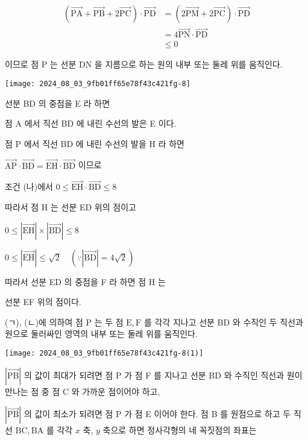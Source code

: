 \documentclass[10pt]{article}
\begin{document}
\[
\begin{aligned}
(\overrightarrow{\mathrm{PA}}+\overrightarrow{\mathrm{PB}}+2 \overrightarrow{\mathrm{PC}}) \cdot \overrightarrow{\mathrm{PD}} & =(2 \overrightarrow{\mathrm{PM}}+2 \overrightarrow{\mathrm{PC}}) \cdot \overrightarrow{\mathrm{PD}} \\
& =4 \overrightarrow{\mathrm{PN}} \cdot \overrightarrow{\mathrm{PD}} \\
& \leq 0
\end{aligned}
\]

이므로 점 P 는 선분 DN 을 지름으로 하는 원의 내부 또는 둘레 위를 움직인다.

\begin{center}
\texttt{[image: 2024\_08\_03\_9fb01ff65e78f43c421fg-8]}
\end{center}

선분 BD 의 중점을 E 라 하면

점 A 에서 직선 BD 에 내린 수선의 발은 E 이다.

점 P 에서 직선 BD 에 내린 수선의 발을 H 라 하면

\(\overrightarrow{\mathrm{AP}} \cdot \overrightarrow{\mathrm{BD}}=\overrightarrow{\mathrm{EH}} \cdot \overrightarrow{\mathrm{BD}}\) 이므로

조건 (나)에서 \(0 \leq \overrightarrow{\mathrm{EH}} \cdot \overrightarrow{\mathrm{BD}} \leq 8\)

따라서 점 H 는 선분 ED 위의 점이고

\(0 \leq|\overrightarrow{\mathrm{EH}}| \times|\overrightarrow{\mathrm{BD}}| \leq 8\)

\(0 \leq|\overrightarrow{\mathrm{EH}}| \leq \sqrt{2} \quad(\because|\overrightarrow{\mathrm{BD}}|=4 \sqrt{2})\)

따라서 선분 ED 의 중점을 F 라 하면 점 H 는

선분 EF 위의 점이다.

(ㄱ), (ㄴ)에 의하여 점 P 는 두 점 \(\mathrm{E}, \mathrm{F}\) 를 각각 지나고 선분 BD 와 수직인 두 직선과 원으로 둘러싸인 영역의 내부 또는 둘레 위를 움직인다.

\begin{center}
\texttt{[image: 2024\_08\_03\_9fb01ff65e78f43c421fg-8(1)]}
\end{center}

\(|\overrightarrow{\mathrm{PB}}|\) 의 값이 최대가 되려면 점 P 가 점 F 를 지나고 선분 BD 와 수직인 직선과 원이 만나는 점 중 점 C 와 가까운 점이어야 하고,

\(|\overrightarrow{\mathrm{PB}}|\) 의 값이 최소가 되려면 점 P 가 점 E 이어야 한다. 점 B 를 원점으로 하고 두 직선 \(\mathrm{BC}, \mathrm{BA}\) 를 각각 \(x\) 축, \(y\) 축으로 하면 정사각형의 네 꼭짓점의 좌표는
\end{document}
